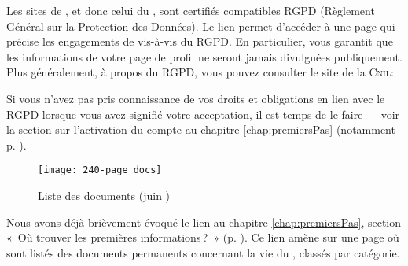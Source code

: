 
\label{sec:rgpd}
Les sites de \CF, et donc celui du \CdS, sont certifiés compatibles RGPD (Règlement Général sur la Protection des Données). Le lien  permet d’accéder à une page qui précise les engagements de \CF{} vis-à-vis du RGPD. En particulier, \CF{} vous garantit que les informations de votre page de profil ne seront jamais divulguées publiquement.
Plus généralement, à propos du RGPD, vous pouvez consulter le site de la \textsc{Cnil}:

\smallskip

\begin{center}
\end{center}

\smallskip

Si vous n’avez pas pris connaissance de vos droits et obligations en lien avec le RGPD lorsque vous avez signifié votre acceptation, il est temps de le faire --- voir la section sur l'activation du compte au chapitre \ref{chap:premiersPas} (notamment p. \pageref{page:accepteRgpd}). 

\label{sec:docs}

\begin{figure}
    \texttt{[image: 240-page\_docs]}
    \caption[Liste des documents]{Liste des documents (juin )}
    \label{fig:listeDocuments}
\end{figure}
Nous avons déjà brièvement évoqué le lien  au chapitre \ref{chap:premiersPas}, section «~Où trouver les premières informations\,?~» (p. \pageref{page:premieresInfos}). Ce lien amène sur une page où sont listés des documents permanents concernant la vie du \sel, classés par catégorie.

